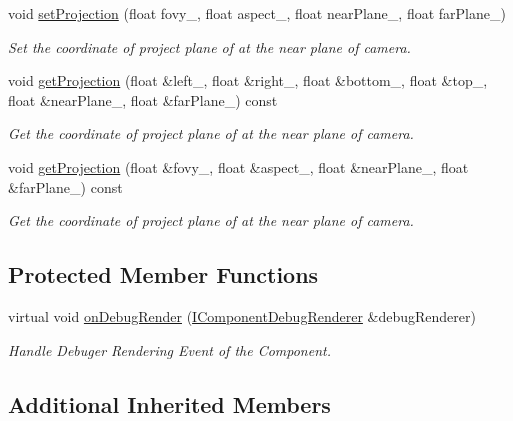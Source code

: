 \begin{DoxyCompactItemize}
void \hyperlink{class_perspective_camera_component_a4a3cc80a282ec870cb1343952b391940}{set\+Projection} (float fovy\+\_\+, float aspect\+\_\+, float near\+Plane\+\_\+, float far\+Plane\+\_\+)
\begin{DoxyCompactList}\small\item\em Set the coordinate of project plane of at the near plane of camera. \end{DoxyCompactList}\item 
void \hyperlink{class_perspective_camera_component_ae3ce00b7bbf1c9e9e073f28793dd1645}{get\+Projection} (float \&left\+\_\+, float \&right\+\_\+, float \&bottom\+\_\+, float \&top\+\_\+, float \&near\+Plane\+\_\+, float \&far\+Plane\+\_\+) const 
\begin{DoxyCompactList}\small\item\em Get the coordinate of project plane of at the near plane of camera. \end{DoxyCompactList}\item 
void \hyperlink{class_perspective_camera_component_a29352b75b672da73782d19fcc2e7b382}{get\+Projection} (float \&fovy\+\_\+, float \&aspect\+\_\+, float \&near\+Plane\+\_\+, float \&far\+Plane\+\_\+) const 
\begin{DoxyCompactList}\small\item\em Get the coordinate of project plane of at the near plane of camera. \end{DoxyCompactList}\end{DoxyCompactItemize}
\subsection*{Protected Member Functions}
\begin{DoxyCompactItemize}
\item 
virtual void \hyperlink{class_perspective_camera_component_a83b864b187b8b5244eb9d23eeef02b5c}{on\+Debug\+Render} (\hyperlink{class_magnum_1_1_i_component_debug_renderer}{I\+Component\+Debug\+Renderer} \&debug\+Renderer)\hypertarget{class_perspective_camera_component_a83b864b187b8b5244eb9d23eeef02b5c}{}\label{class_perspective_camera_component_a83b864b187b8b5244eb9d23eeef02b5c}

\begin{DoxyCompactList}\small\item\em Handle Debuger Rendering Event of the Component. \end{DoxyCompactList}\end{DoxyCompactItemize}
\subsection*{Additional Inherited Members}


